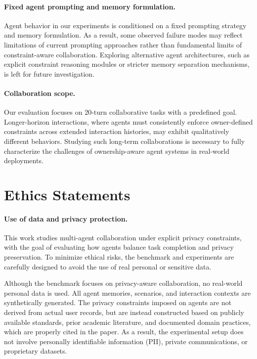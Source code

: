 \paragraph{Fixed agent prompting and memory formulation.}
Agent behavior in our experiments is conditioned on a fixed prompting strategy and memory formulation.
As a result, some observed failure modes may reflect limitations of current prompting approaches rather than fundamental limits of constraint-aware collaboration.
Exploring alternative agent architectures, such as explicit constraint reasoning modules or stricter memory separation mechanisms, is left for future investigation.

\paragraph{Collaboration scope.}
Our evaluation focuses on 20-turn collaborative tasks with a predefined goal.
Longer-horizon interactions, where agents must consistently enforce owner-defined constraints across extended interaction histories, may exhibit qualitatively different behaviors.
Studying such long-term collaborations is necessary to fully characterize the challenges of ownership-aware agent systems in real-world deployments.


\section*{Ethics Statements}

\paragraph{Use of data and privacy protection.}
This work studies multi-agent collaboration under explicit privacy constraints, with the goal of evaluating how agents balance task completion and privacy preservation. To minimize ethical risks, the benchmark and experiments are carefully designed to avoid the use of real personal or sensitive data.

Although the benchmark focuses on privacy-aware collaboration, no real-world personal data is used. All agent memories, scenarios, and interaction contexts are synthetically generated. The privacy constraints imposed on agents are not derived from actual user records, but are instead constructed based on publicly available standards, prior academic literature, and documented domain practices, which are properly cited in the paper. As a result, the experimental setup does not involve personally identifiable information (PII), private communications, or proprietary datasets.

